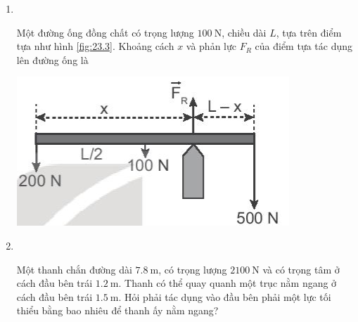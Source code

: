 \begin{enumerate}[label=\bfseries Câu \arabic*:, leftmargin=1.5cm]
\item{}\\
{Một đường ống đồng chất có trọng lượng $\SI{100}{\newton}$, chiều dài $L$, tựa trên điểm tựa như hình \ref{fig:23.3}. Khoảng cách $x$ và phản lực $F_R$ của điểm tựa tác dụng lên đường ống là
	\begin{center}
		\includegraphics[width=0.4\linewidth]{../figs/VN10-2022-PH-TP023-P-3}
		\label{fig:23.3}
	\end{center}

}

\item {}\\
{Một thanh chắn đường dài $\SI{7.8}{\meter}$, có trọng lượng $\SI{2100}{\newton}$ và có trọng tâm
ở cách đầu bên trái $\SI{1.2}{\meter}$. Thanh có thể quay quanh một trục nằm ngang ở cách đầu bên trái $\SI{1.5}{\meter}$. Hỏi phải tác dụng vào đầu bên phải một lực tối thiểu bằng bao nhiêu để thanh ấy nằm ngang?

}
\end{enumerate}
